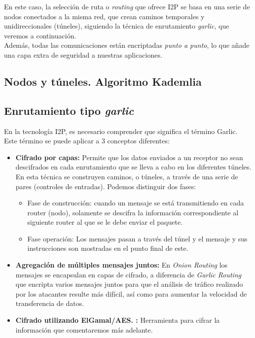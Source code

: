 En este caso, la selección de ruta o \textit{routing} que ofrece I2P se basa en una serie de nodos conectados a la misma red, que crean caminos temporales y unidireccionales (túneles), siguiendo la técnica de enrutamiento \textit{garlic}, que veremos a continuación.\\

Además, todas las comunicaciones están encriptadas \textit{punto a punto}, lo que añade una capa extra de seguridad a nuestras aplicaciones.

\subsection{Nodos y túneles. Algoritmo Kademlia}






\subsection{Enrutamiento tipo \textit{garlic}}

En la tecnología I2P, es necesario comprender que significa el término Garlic. Este término se puede aplicar a 3 conceptos diferentes:

\begin{itemize}
\item \textbf{Cifrado por capas:}
Permite que los datos enviados a un receptor no sean descifrados en cada enrutamiento que se lleva a cabo en los diferentes túneles. 
En esta técnica se construyen caminos, o túneles, a través de una serie de pares (controles de entradas). Podemos distinguir dos fases:


\begin{itemize}
	\item Fase de construcción: cuando un mensaje se está transmitiendo en cada router (nodo), solamente se descifra la información correspondiente al siguiente router al que se le debe enviar el paquete.
	\item 
	Fase  operación: Los mensajes pasan a través del túnel y el mensaje y sus instrucciones son mostradas en el punto final de este.
	
	
\end{itemize}	




\item \textbf{Agregación de múltiples mensajes juntos:}
En \textit{Onion Routing} los mensajes se encapsulan en capas de cifrado, a diferencia de \textit{Garlic Routing} que encripta varios mensajes juntos para que el análisis de tráfico realizado por los atacantes resulte más difícil, así como para aumentar la velocidad de transferencia de datos.


\item \textbf{Cifrado utilizando ElGamal/AES. :}
Herramienta para cifrar la información que comentaremos más adelante.


\end{itemize}




